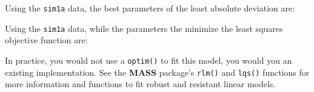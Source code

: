 \documentclass[]{book}
\newenvironment{Shaded}{\begin{snugshade}}{\end{snugshade}}
\newcommand{\CommentTok}[1]{\textcolor[rgb]{0.56,0.35,0.01}{\textit{#1}}}
\newcommand{\ControlFlowTok}[1]{\textcolor[rgb]{0.13,0.29,0.53}{\textbf{#1}}}
\newcommand{\DataTypeTok}[1]{\textcolor[rgb]{0.13,0.29,0.53}{#1}}
\newcommand{\DecValTok}[1]{\textcolor[rgb]{0.00,0.00,0.81}{#1}}
\newcommand{\KeywordTok}[1]{\textcolor[rgb]{0.13,0.29,0.53}{\textbf{#1}}}
\newcommand{\NormalTok}[1]{#1}
\newcommand{\OperatorTok}[1]{\textcolor[rgb]{0.81,0.36,0.00}{\textbf{#1}}}
\newcommand{\StringTok}[1]{\textcolor[rgb]{0.31,0.60,0.02}{#1}}
\theoremstyle{plain}
\theoremstyle{remark}
\theoremstyle{definition}
\theoremstyle{definition}
\theoremstyle{definition}
\theoremstyle{remark}
\begin{document}
\begin{Shaded}
\end{Shaded}

Using the \texttt{sim1a} data, the best parameters of the least absolute
deviation are:

\begin{Shaded}
\end{Shaded}

Using the \texttt{sim1a} data, while the parameters the minimize the
least squares objective function are:

\begin{Shaded}
\end{Shaded}

In practice, you would not use a \texttt{optim()} to fit this model, you
would you an existing implementation. See the \textbf{MASS} package's
\texttt{rlm()} and \texttt{lqs()} functions for more information and
functions to fit robust and resistant linear models.
\end{document}
